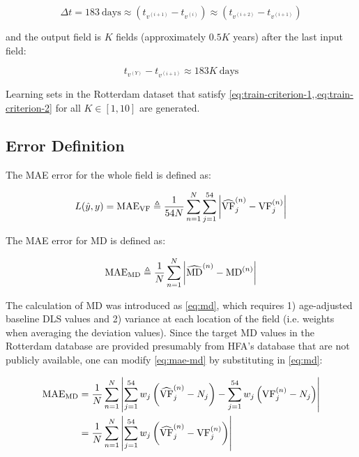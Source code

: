 \begin{equation} \label{eq:train-criterion-1}
\Delta t = 183~\textrm{days} \approx (t_{v^{(i+1)}} - t_{v^{(i)}}) \approx (t_{v^{(i+2)}} - t_{v^{(i+1)}})
\end{equation}

and the output field is $K$ fields (approximately $0.5K$ years) after the last input field:

\begin{equation} \label{eq:train-criterion-2}
t_{v^{(Y)}} - t_{v^{(i+1)}} \approx 183K~\textrm{days}
\end{equation}

Learning sets in the Rotterdam dataset that satisfy \cref{eq:train-criterion-1,,eq:train-criterion-2} for all $K\in[1, 10]$ are generated.

\subsection{Error Definition}

The \ac{MAE} error for the whole field is defined as:

\begin{equation}
L(\hat{y}, y) = \textrm{MAE}_{\textrm{VF}} \triangleq 
\frac{1}{54N} \sum_{n=1}^N \sum_{j=1}^{54} \left|  \widehat{\textrm{VF}}_j^{(n)} - {\textrm{VF}}_j^{(n)}  \right|
\end{equation}

The \ac{MAE} error for \ac{MD} is defined as:

\begin{equation} \label{eq:mae-md}
\textrm{MAE}_{\textrm{MD}} \triangleq
\frac{1}{N} \sum_{n=1}^N \left|  \widehat{\textrm{MD}}^{(n)} - {\textrm{MD}}^{(n)}  \right|
\end{equation}

The calculation of \ac{MD} was introduced as \cref{eq:md}, which requires 1) age-adjusted baseline \ac{DLS} values and 2) variance at each location of the field (i.e. weights when averaging the deviation values). Since the target \ac{MD} values in the Rotterdam database are provided presumably from \ac{HFA}'s database that are not publicly available, one can modify \cref{eq:mae-md} by substituting in \cref{eq:md}:

\begin{align}
\textrm{MAE}_{\textrm{MD}} &=
\frac{1}{N} \sum_{n=1}^N \left| 
\sum_{j=1}^{54} w_j \left( \widehat{\textrm{VF}}_j^{(n)} - N_j \right) - 
\sum_{j=1}^{54} w_j \left( {\textrm{VF}}_j^{(n)} - N_j \right)  \right| \\
&=
\frac{1}{N} \sum_{n=1}^N \left| 
\sum_{j=1}^{54} w_j \left( \widehat{\textrm{VF}}_j^{(n)} - \textrm{VF}_j^{(n)} \right) \right|
\end{align}

